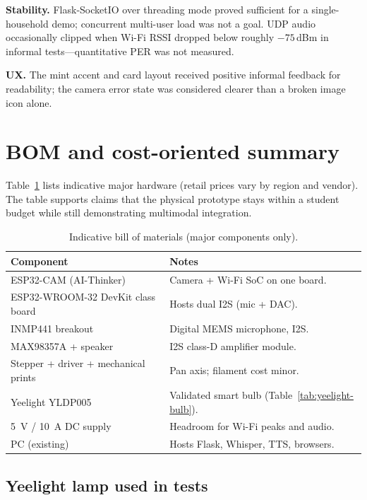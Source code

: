\textbf{Stability.} Flask-SocketIO over threading mode proved sufficient for a single-household demo; concurrent multi-user load was not a goal. UDP audio occasionally clipped when Wi-Fi RSSI dropped below roughly $-75$\,dBm in informal tests---quantitative PER was not measured.

\textbf{UX.} The mint accent and card layout received positive informal feedback for readability; the camera error state was considered clearer than a broken image icon alone.

\section{BOM and cost-oriented summary}

Table~\ref{tab:bom} lists indicative major hardware (retail prices vary by region and vendor). The table supports claims that the physical prototype stays within a student budget while still demonstrating multimodal integration.

\begin{table}[H]
\centering
\caption{Indicative bill of materials (major components only).}
\label{tab:bom}
\small
\begin{tabular}{@{}p{}p{}@{}}
\toprule
\textbf{Component} & \textbf{Notes} \\
\midrule
ESP32-CAM (AI-Thinker) & Camera + Wi-Fi SoC on one board. \\
ESP32-WROOM-32 DevKit class board & Hosts dual I2S (mic + DAC). \\
INMP441 breakout & Digital MEMS microphone, I2S. \\
MAX98357A + speaker & I2S class-D amplifier module. \\
Stepper + driver + mechanical prints & Pan axis; filament cost minor. \\
Yeelight YLDP005 & Validated smart bulb (Table~\ref{tab:yeelight-bulb}). \\
5~V / 10~A DC supply & Headroom for Wi-Fi peaks and audio. \\
PC (existing) & Hosts Flask, Whisper, TTS, browsers. \\
\bottomrule
\end{tabular}
\end{table}

\subsection{Yeelight lamp used in tests}

